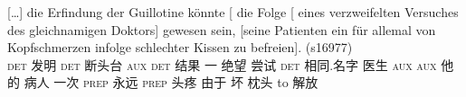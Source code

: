 \ex 
{\raggedright
\gll {}[\ldots] die Erfindung der Guillotine könnte [ die Folge [ eines verzweifelten
    Versuches des gleichnamigen Doktors] gewesen sein, [seine Patienten ein für allemal von
    Kopfschmerzen infolge schlechter Kissen zu befreien]. (s16977)\\
    {}  \textsc{det} 发明 \textsc{det} 断头台 \textsc{aux} {} \textsc{det} 结果 {} 一 绝望 尝试 \textsc{det} 相同.名字 医生 \textsc{aux} \textsc{aux} \spacebr{}他的 病人
一次 \textsc{prep} 永远 \textsc{prep} 头疼 由于 坏 枕头 to 解放\\
\par}
\zl

